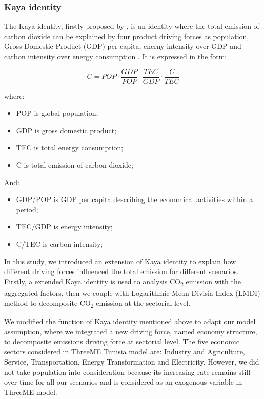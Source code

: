 \documentclass[
]{article}
\providecommand{\tightlist}{%
  \setlength{\itemsep}{0pt}\setlength{\parskip}{0pt}}
\begin{document}
\hypertarget{kaya-identity}{%
\subsubsection{Kaya identity}\label{kaya-identity}}

The Kaya identity, firstly proposed by \autocite{kaya1989}, is an
identity where the total emission of carbon dioxide can be explained by
four product driving forces as population, Gross Domestic Product (GDP)
per capita, enerny intensity over GDP and carbon intensity over energy
consumption \autocite{kayaide2021}. It is expressed in the form:

\[ C = POP \cdot \frac{GDP}{POP} \cdot \frac{TEC}{GDP} \cdot \frac{C}{TEC} \tag{1}\]

where:

\begin{itemize}
\tightlist
\item
  POP is global population;
\item
  GDP is gross domestic product;
\item
  TEC is total energy consumption;
\item
  C is total emission of carbon dioxide;
\end{itemize}

And:

\begin{itemize}
\tightlist
\item
  GDP/POP is GDP per capita describing the economical activities within
  a period;
\item
  TEC/GDP is energy intensity;
\item
  C/TEC is carbon intensity;
\end{itemize}

In this study, we introduced an extension of Kaya identity to explain
how different driving forces influenced the total emission for different
scenarios. Firstly, a extended Kaya identity is used to analysis
CO\textsubscript{2} emission with the aggregated factors, then we couple
with Logarithmic Mean Divisia Index (LMDI) method to decomposite
CO\textsubscript{2} emission at the sectorial level.

We modified the function of Kaya identity mentioned above to adapt our
model assumption, where we integrated a new driving force, named economy
structure, to decomposite emissions driving force at sectorial level.
The five economic sectors considered in ThreeME Tunisia model are:
Industry and Agriculture, Service, Transportation, Energy Transformation
and Electricity. However, we did not take population into consideration
because its increasing rate remains still over time for all our
scenarios and is considered as an exogenous variable in ThreeME model.
\end{document}
